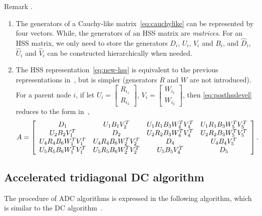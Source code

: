 \documentclass[times]{nlaauth}
\newcounter{algorithm}
\newcounter{remark}
\newenvironment{remark}{\refstepcounter{remark}\vspace{1ex}
{\sc Remark \theremark.}\hspace{0.3em}\parindent=0pt}{\vspace{1ex}}
\begin{document}
\begin{remark}
\begin{enumerate}
  \item The generators of a Cauchy-like matrix~\eqref{eq:cauchylike} can be represented by four vectors.
  While, the generators of an HSS matrix are \emph{matrices}.
  For an HSS matrix, we only need to store the generators $D_i$, $U_i$, $V_i$ and $B_i$, and
  $\widehat{D}_i$, $\widehat{U}_i$ and $\widehat{V}_i$ can be constructed hierarchically when needed.

  \item The HSS representation~\eqref{eq:new-hss} is equivalent to the previous representations in~\cite{Hss-ulv,ChandrasekaranGu04,Xia-HSS-Chol},
   but is simpler (generators $R$ and $W$ are not introduced).
   For a parent node $i$, if let $U_i=\begin{bmatrix} R_{i_1} \\ R_{i_2} \end{bmatrix}$, $V_i=\begin{bmatrix} W_{i_1} \\ W_{i_2} \end{bmatrix}$, then
   \eqref{eq:posthsslevel} reduces to the form in~\cite{Xia-HSS-Chol},
   \begin{equation*}
     A=\left[
\begin{array}
[c]{cccc}D_{1} & U_{1}B_{1}V_{2}^{T} & U_{1}R_{1}B_{3}W_{4}^{T}V_{4}^{T} & U_{1}R_{1}B_{3}W_{5}^{T}V_{5}^{T}\\
U_{2}B_{2}V_{1}^{T} & D_{2} & U_{2}R_{2}B_{3}W_{4}^{T}V_{4}^{T} & U_{2}R_{2}B_{3}W_{5}^{T}V_{5}^{T}\\
U_{4}R_{4}B_{6}W_{1}^{T}V_{1}^{T} & U_{4}R_{4}B_{6}W_{2}^{T}V_{2}^{T} & D_{4}
& U_{4}B_{4}V_{5}^{T}\\
U_{5}R_{5}B_{6}W_{1}^{T}V_{1}^{T} & U_{5}R_{5}B_{6}W_{2}^{T}V_{2}^{T} &
U_{5}B_{5}V_{4}^{T} & D_{5}\end{array}
\right]. \label{eq:posterHSS}\end{equation*}

\end{enumerate}
\end{remark}

\subsection{Accelerated tridiagonal DC algorithm}
\label{sec:sdc}
The procedure of ADC algorithms is expressed in the following algorithm,
which is similar to the DC algorithm~\cite{Demmel-book}.
\end{document}
